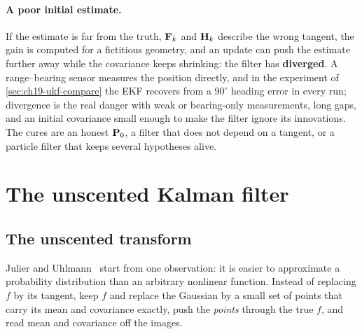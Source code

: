 \paragraph{A poor initial estimate.}
If the estimate is far from the truth, $\mathbf{F}_k$ and $\mathbf{H}_k$ describe
the wrong tangent, the gain is computed for a fictitious geometry, and an
update can push the estimate further away while the covariance keeps
shrinking: the filter has
\textbf{diverged}. A range--bearing sensor measures
the position directly, and in the experiment of \cref{sec:ch19-ukf-compare}
the EKF recovers from a $90^\circ$ heading error in every run; divergence is
the real danger with weak or bearing-only measurements, long gaps, and an
initial covariance small enough to make the filter ignore its innovations.
The cures are an honest $\mathbf{P}_0$, a filter that does not depend on a
tangent, or a particle filter that keeps several hypotheses alive.

\section{The unscented Kalman filter}
\label{sec:ch19-ukf}

\subsection{The unscented transform}
\label{sec:ch19-ut}

Julier and Uhlmann~\cite{julier1997new,julier2004unscented} start from one
observation: it is easier to approximate a probability distribution than an
arbitrary nonlinear function. Instead of replacing $f$ by its tangent, keep
$f$ and replace the Gaussian by a small set of points that carry its mean and
covariance exactly, push the \emph{points} through the true $f$, and read
mean and covariance off the images.

